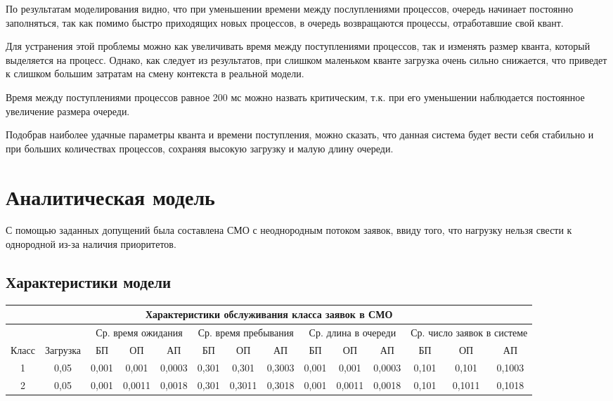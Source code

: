 По результатам моделирования видно, что при уменьшении времени между послуплениями
процессов, очередь начинает постоянно заполняться, так как помимо быстро приходящих
новых процессов, в очередь возвращаются процессы, отработавшие свой квант.

Для устранения этой проблемы можно как увеличивать время между поступлениями
процессов, так и изменять размер кванта, который выделяется на процесс. Однако,
как следует из результатов, при слишком маленьком кванте загрузка очень сильно
снижается, что приведет к слишком большим затратам на смену контекста в реальной модели.

Время между поступлениями процессов равное 200 мс можно назвать критическим,
т.к. при его уменьшении наблюдается постоянное увеличение размера очереди.

Подобрав наиболее удачные параметры кванта и времени поступления, можно сказать,
что данная система будет вести себя стабильно и при больших количествах процессов,
сохраняя высокую загрузку и малую длину очереди.


\newpage
\section{Аналитическая модель}
С помощью заданных допущений была составлена СМО с неоднородным потоком заявок,
ввиду того, что нагрузку нельзя свести к однородной из-за наличия приоритетов.

\subsection{Характеристики модели}

\begin{adjustbox}{max width=\textwidth}
\begin{tabular}{|c|c|c|c|c|c|c|c|c|c|c|c|c|c|}
\hline
\multicolumn{14}{|c|}{Характеристики обслуживания класса заявок в СМО} \\ \hline
& & \multicolumn{3}{|c|}{Ср. время ожидания} & \multicolumn{3}{|c|}{Ср. время пребывания} & \multicolumn{3}{|c|}{Ср. длина в очереди} & \multicolumn{3}{|c|}{Ср. число заявок в системе} \\ \hline
Класс & Загрузка & БП & ОП & АП & БП & ОП & АП & БП & ОП & АП & БП & ОП & АП \\ \hline
1 & 0,05 & 0,001 & 0,001 & 0,0003 & 0,301 & 0,301 & 0,3003 & 0,001 & 0,001 & 0,0003 & 0,101 & 0,101 & 0,1003 \\ \hline
2 & 0,05 & 0,001 & 0,0011 & 0,0018 & 0,301 & 0,3011 & 0,3018 & 0,001 & 0,0011 & 0,0018 & 0,101 & 0,1011 & 0,1018 \\ \hline
\end{tabular}
\end{adjustbox}
\\

